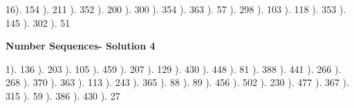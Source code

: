 \documentclass{article}%
\begin{document}
16). 154%
). 211%
). 352%
). 200%
). 300%
). 354%
). 363%
). 57%
). 298%
). 103%
). 118%
). 353%
). 145%
). 302%
). 51%
\newline%
\newpage%
\large%
\begin{center}%
\textbf{Number Sequences- Solution 4}%
\newline%
\end{center} \normalsize%
1). 136%
). 203%
). 105%
). 459%
). 207%
). 129%
). 430%
). 448%
). 81%
). 388%
). 441%
). 266%
). 268%
). 370%
). 363%
). 113%
). 243%
). 365%
). 88%
). 89%
). 456%
). 502%
). 230%
). 477%
). 367%
). 315%
). 59%
). 386%
). 430%
). 27%
\newline%
\newpage%
\end{document}

